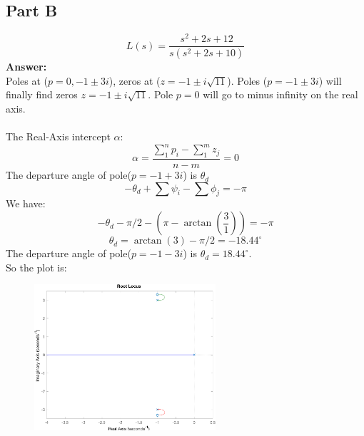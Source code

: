 \documentclass[a4paper]{article}
\begin{document}
\subsection{Part B}
$$
L(s) = \frac{s^2+2s+12}{s(s^2+2s+10)}
$$
{\bf Answer:}\\
Poles at ($p = 0, -1\pm 3i$), zeros at ($z = -1\pm i\sqrt{11}$). Poles ($p =  -1\pm 3i$) will finally find zeros $z = -1\pm i\sqrt{11}$. Pole $p = 0$ will go to minus infinity on the real axis. \\
\\
The Real-Axis intercept $\alpha$:
$$
\alpha = \frac{\sum_{1}^{n}p_i-\sum_1^m z_j}{n-m} = 0
$$
The departure angle of pole($p = -1+3i$) is $\theta_d$
$$
-\theta_d +  \sum\psi_i-\sum \phi_j = - \pi
$$
We have:
$$
-\theta_d -\pi/2 - (\pi - \arctan(\frac{3}{1})) = -\pi
$$
$$
\theta_d = \arctan(3) - \pi/2 = -18.44^{\circ} 
$$
The departure angle of pole($p = -1-3i$) is $\theta_d = 18.44^{\circ}$.\\
So the plot is:
\begin{figure}[H]
\centering
\includegraphics[width = 0.6\textwidth]{pic/t2.png}
\end{figure}
\end{document}
